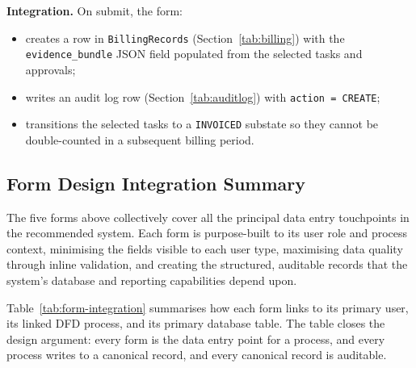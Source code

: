 \documentclass[12pt,a4paper]{report}
\begin{document}
\textbf{Integration.} On submit, the form:
\begin{itemize}[leftmargin=1.6em]
    \item creates a row in \texttt{BillingRecords} (Section~\ref{tab:billing})
          with the \texttt{evidence\_bundle} JSON field populated from the
          selected tasks and approvals;
    \item writes an audit log row (Section~\ref{tab:auditlog}) with
          \texttt{action = CREATE};
    \item transitions the selected tasks to a \texttt{INVOICED} substate
          so they cannot be double-counted in a subsequent billing period.
\end{itemize}

\subsection{Form Design Integration Summary}
\label{sec:form-integration}

The five forms above collectively cover all the principal data entry
touchpoints in the recommended system. Each form is purpose-built to its
user role and process context, minimising the fields visible to each user
type, maximising data quality through inline validation, and creating the
structured, auditable records that the system's database and reporting
capabilities depend upon.

Table~\ref{tab:form-integration} summarises how each form links to its
primary user, its linked DFD process, and its primary database table. The
table closes the design argument: every form is the data entry point for
a process, and every process writes to a canonical record, and every
canonical record is auditable.
\end{document}
